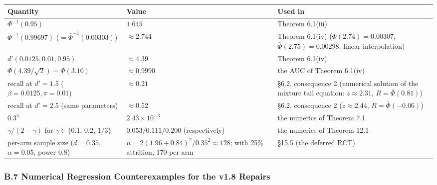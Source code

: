 \documentclass[
  11pt]{article}
\begin{document}
\begin{longtable}[]{@{}
  >{\raggedright\arraybackslash}p{}
  >{\raggedright\arraybackslash}p{}
  >{\raggedright\arraybackslash}p{}@{}}
\toprule\noalign{}
\begin{minipage}[b]{\linewidth}\raggedright
Quantity
\end{minipage} & \begin{minipage}[b]{\linewidth}\raggedright
Value
\end{minipage} & \begin{minipage}[b]{\linewidth}\raggedright
Used in
\end{minipage} \\
\midrule\noalign{}
\endhead
\bottomrule\noalign{}
\endlastfoot
\(\Phi^{-1}(0.95)\) & \(1.645\) & Theorem 6.1(iii) \\
\(\Phi^{-1}(0.99697)\) (\(=\bar\Phi^{-1}(0.00303)\)) & \(\approx 2.744\)
& Theorem 6.1(iv) (\(\bar\Phi(2.74)=0.00307\),
\(\bar\Phi(2.75)=0.00298\), linear interpolation) \\
\(\underline{d'}(0.0125, 0.01, 0.95)\) & \(\approx 4.39\) & Theorem
6.1(iv) \\
\(\Phi(4.39/\sqrt2) = \Phi(3.10)\) & \(\approx 0.9990\) & the AUC of
Theorem 6.1(iv) \\
recall at \(d'=1.5\) (\(\beta=0.0125, \pi=0.01\)) & \(\approx 0.21\) &
§6.2, consequence 2 (numerical solution of the mixture tail equation:
\(z \approx 2.31\), \(R = \bar\Phi(0.81)\)) \\
recall at \(d'=2.5\) (same parameters) & \(\approx 0.52\) & §6.2,
consequence 2 (\(z \approx 2.44\), \(R = \bar\Phi(-0.06)\)) \\
\(0.3^5\) & \(2.43\times10^{-3}\) & the numerics of Theorem 7.1 \\
\(\gamma/(2-\gamma)\) for \(\gamma \in \{0.1,\, 0.2,\, 1/3\}\) &
\(0.053 / 0.111 / 0.200\) (respectively) & the numerics of Theorem
12.1 \\
per-arm sample size (\(d=0.35\), \(\alpha=0.05\), power \(0.8\)) &
\(n = 2(1.96+0.84)^2/0.35^2 \approx 128\); with 25\% attrition, 170 per
arm & §15.5 (the deferred RCT) \\
\end{longtable}

\subsubsection{B.7 Numerical Regression Counterexamples for the v1.8
Repairs}\label{b.7-numerical-regression-counterexamples-for-the-v1.8-repairs}
\end{document}

